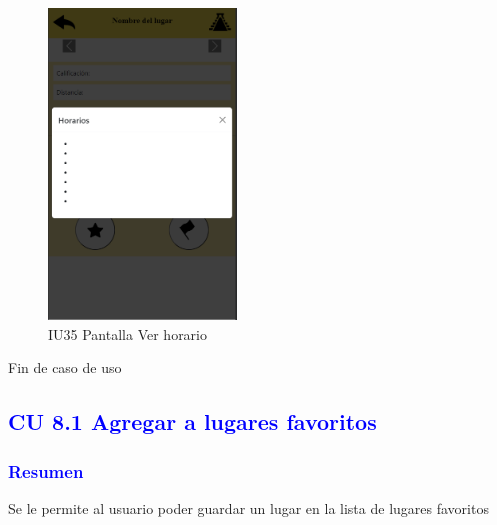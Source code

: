      \begin{figure}[htb]
        \centering
        \includegraphics[width= 5cm]{entregable final/pantallasSistema/IU35 Pantalla Ver horario.png}
    \caption{IU35 Pantalla Ver horario}
        \label{fig:enter-label}
    \end{figure}

Fin de caso de uso
\newpage



\pagebreak
\subsection{\textcolor{blue}{CU 8.1 Agregar a lugares favoritos}}
\subsubsection{\textcolor{blue}{Resumen}}
 Se le permite al usuario poder guardar un lugar en la lista de lugares favoritos
